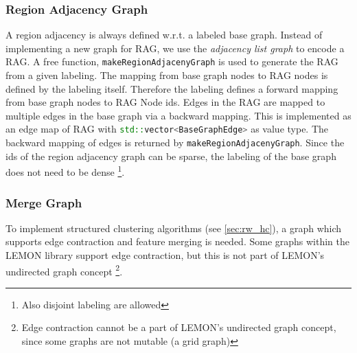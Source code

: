 \subsubsection{Region Adjacency Graph} \label{sec:graphs_rag}

A region adjacency is always defined w.r.t. a labeled base graph.
Instead of implementing a new graph for RAG, we use
the \emph{adjacency list graph} to encode a RAG.
A free function, \lstinline[language=c++]{makeRegionAdjacenyGraph} 
is used to generate the RAG from a given labeling.
The mapping from base graph nodes to RAG nodes  is defined
by the labeling itself. Therefore
the labeling defines a forward mapping from base graph nodes
to RAG Node ids.
Edges in the RAG are mapped to multiple edges in the base graph
via a backward mapping.
This is implemented as an edge map of RAG with
\lstinline[language=c++]{std::vector<BaseGraphEdge>} as value type.
The backward mapping of edges is returned by \lstinline[language=c++]{makeRegionAdjacenyGraph}.
Since the ids of the region adjacency graph can be 
sparse, the labeling of the base graph does not need to be dense
\footnote{Also disjoint labeling are allowed}.



\subsubsection{Merge Graph} \label{sec:graphs_merge_graph}

To implement structured clustering algorithms (see \cref{sec:rw_hc}), 
a graph which supports edge contraction and feature merging is needed.
Some graphs within the LEMON library support 
edge contraction, but this is not part of LEMON's undirected graph concept \footnote{
Edge contraction cannot be a part of LEMON's undirected graph concept, since some graphs
are not mutable (\eg a grid graph)}.

